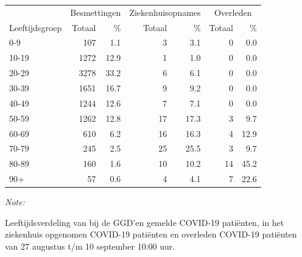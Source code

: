 \documentclass[
  english,
  man,floatsintext]{apa6}
\begin{document}
\begin{table}[H]
\centering\begingroup\fontsize{11}{13}\selectfont

\begin{threeparttable}
\begin{tabular}{lrrrrrr}
\toprule
\multicolumn{1}{c}{ } & \multicolumn{2}{c}{Besmettingen} & \multicolumn{2}{c}{Ziekenhuisopnames} & \multicolumn{2}{c}{Overleden} \\
\cmidrule(l{3pt}r{3pt}){2-3} \cmidrule(l{3pt}r{3pt}){4-5} \cmidrule(l{3pt}r{3pt}){6-7}
Leeftijdsgroep & Totaal & \% & Totaal & \% & Totaal & \%\\
\midrule
0-9 & 107 & 1.1 & 3 & 3.1 & 0 & 0.0\\
10-19 & 1272 & 12.9 & 1 & 1.0 & 0 & 0.0\\
20-29 & 3278 & 33.2 & 6 & 6.1 & 0 & 0.0\\
30-39 & 1651 & 16.7 & 9 & 9.2 & 0 & 0.0\\
40-49 & 1244 & 12.6 & 7 & 7.1 & 0 & 0.0\\
50-59 & 1262 & 12.8 & 17 & 17.3 & 3 & 9.7\\
60-69 & 610 & 6.2 & 16 & 16.3 & 4 & 12.9\\
70-79 & 245 & 2.5 & 25 & 25.5 & 3 & 9.7\\
80-89 & 160 & 1.6 & 10 & 10.2 & 14 & 45.2\\
90+ & 57 & 0.6 & 4 & 4.1 & 7 & 22.6\\
\bottomrule
\end{tabular}
\begin{tablenotes}
\item \textit{Note: } 
\item Leeftijdsverdeling van bij de GGD’en gemelde COVID-19 patiënten, in het ziekenhuis opgenomen COVID-19 patiënten en overleden COVID-19 patiënten van 27 augustus t/m 10 september 10:00 uur.
\end{tablenotes}
\end{threeparttable}
\endgroup{}
\end{table}
\end{document}
